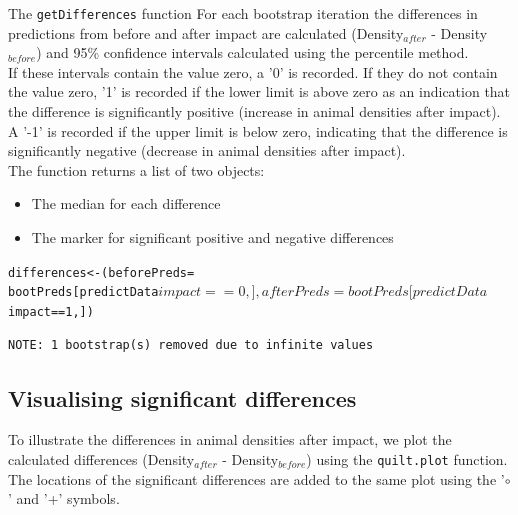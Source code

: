 \begin{block}{The {\tt getDifferences} function}
For each bootstrap iteration the differences in predictions from before and after impact are calculated (Density$_{after}$ - Density$_{before}$) and 95\% confidence intervals calculated using the percentile method. \\

\noindent If these intervals contain the value zero, a '0' is recorded. If they do not contain the value zero, '1' is recorded if the lower limit is above zero as an indication that the difference is significantly positive (increase in animal densities after impact). A '-1' is recorded if the upper limit is below zero, indicating that the difference is significantly negative (decrease in animal densities after impact). \\

\noindent The function returns a list of two objects: 
\begin{itemize}
\item{The median for each difference}
\item{The marker for significant positive and negative differences}
\end{itemize}
\end{block}


\begin{knitrout}\footnotesize
{}\color{fgcolor}\begin{kframe}
\begin{alltt}
differences <- (beforePreds = 
        bootPreds[predictData$impact == 0, ], 
        afterPreds = bootPreds[predictData$impact == 1, ])
\end{alltt}
\begin{verbatim}
NOTE: 1 bootstrap(s) removed due to infinite values
\end{verbatim}
\end{kframe}
\end{knitrout}


\subsection{Visualising significant differences}
To illustrate the differences in animal densities after impact, we plot the calculated differences (Density$_{after}$ - Density$_{before}$) using the {\tt quilt.plot} function.\\

\noindent The locations of the significant differences are added to the same plot using the '$\circ$' and '+' symbols. 

